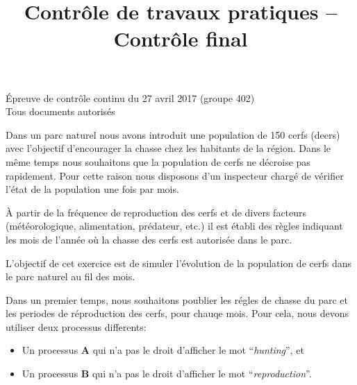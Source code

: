 \documentclass[CC,sansRappel,12pt]{tdtp-utf8}
\date{}
\title{Contrôle de travaux pratiques -- Contrôle final}
\newcommand{\tocorrect}[1]{\textcolor{dgreen}{#1}}
\begin{document}
\begin{feuille}

\hspace*{1mm} \hfill Épreuve de contrôle continu du 27 avril 2017 (groupe 402)\\
\hspace*{1mm} \hfill Tous documents autorisés\\[5mm]


\vspace{20pt}

Dans un parc naturel nous avons introduit une population de 150 cerfs (deers) avec l'objectif d'encourager la chasse chez les habitants de la région. Dans le même temps nous souhaitons que la population de cerfs ne décroise pas rapidement. Pour cette raison nous disposons d'un inspecteur chargé de vérifier l'état de la population une fois par mois.

À partir de la fréquence de reproduction des cerfs et de divers facteurs (météorologique, alimentation, prédateur, etc.) il est établi des règles indiquant les mois de l'année où la chasse des cerfs est autorisée dans le parc.

L'objectif de cet exercice est de simuler l'évolution de la population de cerfs dans le parc naturel au fil des mois.

\begin{exercice}

\tocorrect{Dans un premier temps, nous souhaitons poublier les régles de chasse du parc et les periodes de réproduction des cerfs, pour chauqe mois. Pour cela, nous devons utiliser deux processus differents:}

\begin{itemize}
\item Un processus \textbf{A} qui n'a pas le droit d'afficher le mot ``\textit{hunting}'', et
\item Un processus \textbf{B} qui n'a pas le droit d'afficher le mot ``\textit{reproduction}''.
\end{itemize}


\end{exercice}
\end{feuille}
\end{document}
